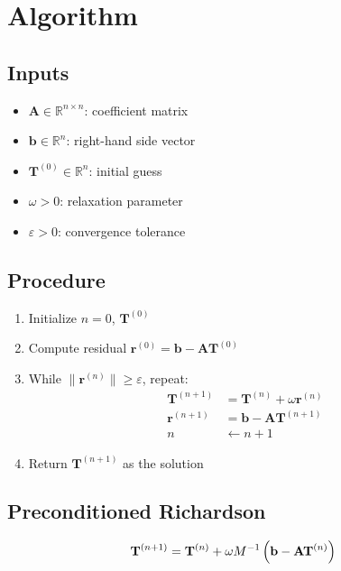 \documentclass[12pt]{article}
\begin{document}
\section*{Algorithm}

\subsection*{Inputs}
\begin{itemize}
    \item \( \mathbf{A} \in \mathbb{R}^{n \times n} \): coefficient matrix
    \item \( \mathbf{b} \in \mathbb{R}^{n} \): right-hand side vector
    \item \( \mathbf{T}^{(0)} \in \mathbb{R}^{n} \): initial guess
    \item \( \omega > 0 \): relaxation parameter
    \item \( \varepsilon > 0 \): convergence tolerance
\end{itemize}

\subsection*{Procedure}
\begin{enumerate}
    \item Initialize \( n = 0 \), \( \mathbf{T}^{(0)} \)
    \item Compute residual \( \mathbf{r}^{(0)} = \mathbf{b} - \mathbf{A} \mathbf{T}^{(0)} \)
    \item While \( \| \mathbf{r}^{(n)} \| \geq \varepsilon \), repeat:
    \begin{align*}
        \mathbf{T}^{(n+1)} &= \mathbf{T}^{(n)} + \omega \mathbf{r}^{(n)} \\
        \mathbf{r}^{(n+1)} &= \mathbf{b} - \mathbf{A} \mathbf{T}^{(n+1)} \\
        n &\leftarrow n + 1
    \end{align*}
    \item Return \( \mathbf{T}^{(n+1)} \) as the solution
\end{enumerate}


\subsection*{Preconditioned Richardson }

\[
        \mathbf{T}^{(n+1)} = \mathbf{T}^{(n)} + \omega M^{-1} \left(  \mathbf{b} - \mathbf{A} \mathbf{T}^{(n)}\right) \\
\]
\end{document}
